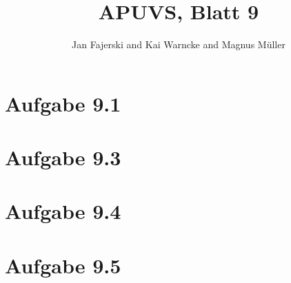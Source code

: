 \documentclass[a4paper,
12pt,
BCOR12mm,
]{scrartcl}
\title{APUVS, Blatt 9}
\author{Jan Fajerski and Kai Warncke and Magnus Müller}
\theoremstyle{break}
\begin{document}

\maketitle 

\section*{Aufgabe 9.1}


\section*{Aufgabe 9.3}


\section*{Aufgabe 9.4}


\section*{Aufgabe 9.5}

\end{document}
